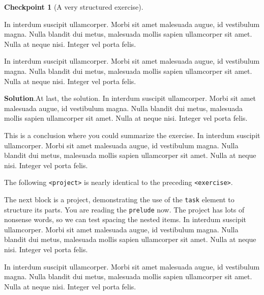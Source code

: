 \documentclass{amsart}
\theoremstyle{plain}%
\theoremstyle{definition}%
\newtheorem{inlineexercise}[theorem]{Checkpoint}
\theoremstyle{remark}%
\newcommand{\blocktitlefont}{\relax}
\newcommand{\mono}[1]{\texttt{#1}}
\numberwithin{equation}{section}
\begin{document}
\begin{inlineexercise}[A very structured exercise]
\begin{enumerate}[font=\bfseries,label=(\alph*),ref=\alph*]
\par
In interdum suscipit ullamcorper. Morbi sit amet malesuada augue, id vestibulum magna. Nulla blandit dui metus, malesuada mollis sapien ullamcorper sit amet. Nulla at neque nisi. Integer vel porta felis.%
\par
In interdum suscipit ullamcorper. Morbi sit amet malesuada augue, id vestibulum magna. Nulla blandit dui metus, malesuada mollis sapien ullamcorper sit amet. Nulla at neque nisi. Integer vel porta felis.%
\par\smallskip%
\noindent\textbf{\blocktitlefont Solution}.\hypertarget{exercise-structured-6-5}{}\quad{}At last, the solution.  In interdum suscipit ullamcorper. Morbi sit amet malesuada augue, id vestibulum magna. Nulla blandit dui metus, malesuada mollis sapien ullamcorper sit amet. Nulla at neque nisi. Integer vel porta felis.%
\end{enumerate}%
This is a conclusion where you could summarize the exercise.  In interdum suscipit ullamcorper. Morbi sit amet malesuada augue, id vestibulum magna. Nulla blandit dui metus, malesuada mollis sapien ullamcorper sit amet. Nulla at neque nisi. Integer vel porta felis.%
\end{inlineexercise}%
The following \mono{<project>} is nearly identical to the preceding \mono{<exercise>}.%
\par
The next block is a project, demonstrating the use of the \mono{task} element to structure its parts.  You are reading the \mono{prelude} now.  The project has lots of nonsense words, so we can test spacing the nested items.  In interdum suscipit ullamcorper. Morbi sit amet malesuada augue, id vestibulum magna. Nulla blandit dui metus, malesuada mollis sapien ullamcorper sit amet. Nulla at neque nisi. Integer vel porta felis.%
\par
In interdum suscipit ullamcorper. Morbi sit amet malesuada augue, id vestibulum magna. Nulla blandit dui metus, malesuada mollis sapien ullamcorper sit amet. Nulla at neque nisi. Integer vel porta felis.%
\end{document}
